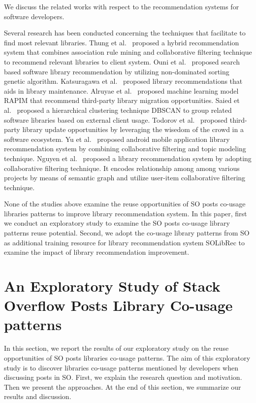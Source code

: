 \documentclass[paper]{ieice}
\begin{document}

We discuss the related works with respect to the recommendation systems for software developers. 

Several research has been conducted concerning the techniques that facilitate to find most relevant libraries. Thung et al.~\cite{thung2013automated} proposed a hybrid recommendation system that combines association rule mining  and collaborative filtering technique to recommend relevant libraries to client system. Ouni et al.~\cite{ouni2017search} proposed search based software library recommendation by utilizing non-dominated sorting genetic algorithm. Katsuragawa et al.~\cite{katsuragawa2018maintaining} proposed library recommendations that aids in library maintenance. Alruyae et al.~\cite{alrubaye2020learning} proposed machine learning model RAPIM that recommend third-party library migration opportunities. Saied et al.~\cite{saied2018improving} proposed a hierarchical clustering technique DBSCAN to group related software libraries based on external client usage. Todorov et al.~\cite{todorov2017sol} proposed third-party library update opportunities by leveraging the wisedom of the crowd in a software ecosystem. Yu et al.~\cite{yu2017combining} proposed android mobile application library recommendation system by combining collaborative filtering and topic modeling technique. Nguyen et al.~\cite{nguyen2020crossrec} proposed a library recommendation system by adopting collaborative filtering technique. It encodes relationship among among various projects by means of semantic graph and utilize user-item collaborative filtering technique. 

None of the studies above examine the reuse opportunities of SO posts co-usage libraries patterns to improve library recommendation system. In this paper, first we conduct an exploratory study to examine the SO posts co-usage library patterns reuse potential. Second, we adopt the co-usage library patterns from SO as additional training resource for library recommendation system SOLibRec to examine the impact of library recommendation improvement.



\section{An Exploratory Study of Stack Overflow Posts Library Co-usage patterns}
\label{sec:prelimanary}
In this section, we report the results of our exploratory study on the reuse opportunities of SO posts libraries co-usage patterns.
The aim of this exploratory study is to discover libraries co-usage patterns mentioned by developers when discussing posts in SO. First, we explain the research question and motivation. Then we present the approaches. At the end of this section, we summarize our results and discussion. 
\\
\end{document}
